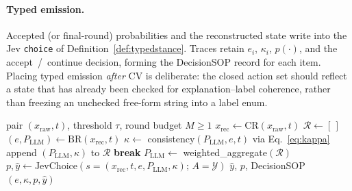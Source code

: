 \documentclass[10pt]{article}
\theoremstyle{definition}
\begin{document}
\paragraph{Typed emission.}
Accepted (or final-round) probabilities and the reconstructed state write into the Jev \texttt{choice} of
Definition~\ref{def:typedstance}.
Traces retain $e_i$, $\kappa_i$, $p(\cdot)$, and the accept~/~continue decision, forming the DecisionSOP
record for each item.
Placing typed emission \emph{after} CV is deliberate: the closed action set should reflect a state that has
already been checked for explanation--label coherence, rather than freezing an unchecked free-form string into
a label enum.

\begin{algorithm}[t]
\caption{StanceJEV path under round budget $M$}
\label{alg:stancejev}
\begin{algorithmic}[1]
\Require pair $(x_{\mathrm{raw}},t)$, threshold $\tau$, round budget $M\ge 1$
\State $x_{\mathrm{rec}}\gets\mathrm{CR}(x_{\mathrm{raw}},t)$
\State $\mathcal{R}\gets[\,]$ 
  \State $(e,P_{\mathrm{LLM}})\gets\mathrm{BR}(x_{\mathrm{rec}},t)$ 
  \State $\kappa\gets$ consistency$(P_{\mathrm{LLM}},e,t)$ via Eq.~\eqref{eq:kappa}
  \State append $(P_{\mathrm{LLM}},\kappa)$ to $\mathcal{R}$
  \If{$\kappa\ge\tau$}
    \State \textbf{break}
  \EndIf
\EndFor
{}
  \State $P_{\mathrm{LLM}}\gets$ weighted\_aggregate$(\mathcal{R})$
\EndIf
\State $p,\hat{y}\gets\mathrm{JevChoice}(s{=}(x_{\mathrm{rec}},t,e,P_{\mathrm{LLM}},\kappa);\,A{=}\mathcal{Y})$
\State \Return $\hat{y}$, $p$, DecisionSOP$(e,\kappa,p,\hat{y})$
\end{algorithmic}
\end{algorithm}
\end{document}
